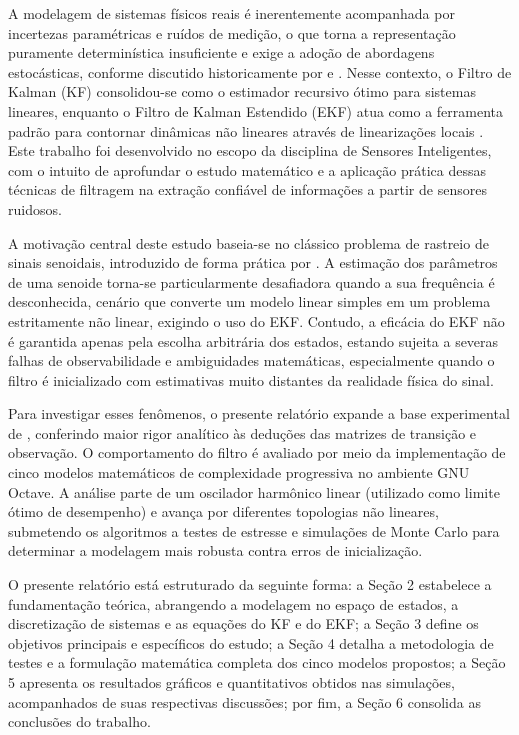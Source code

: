 \documentclass[a4paper,12pt]{article}
\begin{document}
A modelagem de sistemas físicos reais é inerentemente acompanhada por incertezas paramétricas e ruídos de medição, o que torna a representação puramente determinística insuficiente e exige a adoção de abordagens estocásticas, conforme discutido historicamente por  e . Nesse contexto, o Filtro de Kalman (KF) \cite{kalman1960} consolidou-se como o estimador recursivo ótimo para sistemas lineares, enquanto o Filtro de Kalman Estendido (EKF) atua como a ferramenta padrão para contornar dinâmicas não lineares através de linearizações locais \cite{gelb1974, simon2006}. Este trabalho foi desenvolvido no escopo da disciplina de Sensores Inteligentes, com o intuito de aprofundar o estudo matemático e a aplicação prática dessas técnicas de filtragem na extração confiável de informações a partir de sensores ruidosos.

A motivação central deste estudo baseia-se no clássico problema de rastreio de sinais senoidais, introduzido de forma prática por . A estimação dos parâmetros de uma senoide torna-se particularmente desafiadora quando a sua frequência é desconhecida, cenário que converte um modelo linear simples em um problema estritamente não linear, exigindo o uso do EKF. Contudo, a eficácia do EKF não é garantida apenas pela escolha arbitrária dos estados, estando sujeita a severas falhas de observabilidade e ambiguidades matemáticas, especialmente quando o filtro é inicializado com estimativas muito distantes da realidade física do sinal.

Para investigar esses fenômenos, o presente relatório expande a base experimental de , conferindo maior rigor analítico às deduções das matrizes de transição e observação. O comportamento do filtro é avaliado por meio da implementação de cinco modelos matemáticos de complexidade progressiva no ambiente GNU Octave. A análise parte de um oscilador harmônico linear (utilizado como limite ótimo de desempenho) e avança por diferentes topologias não lineares, submetendo os algoritmos a testes de estresse e simulações de Monte Carlo para determinar a modelagem mais robusta contra erros de inicialização.

O presente relatório está estruturado da seguinte forma: a Seção 2 estabelece a fundamentação teórica, abrangendo a modelagem no espaço de estados, a discretização de sistemas e as equações do KF e do EKF; a Seção 3 define os objetivos principais e específicos do estudo; a Seção 4 detalha a metodologia de testes e a formulação matemática completa dos cinco modelos propostos; a Seção 5 apresenta os resultados gráficos e quantitativos obtidos nas simulações, acompanhados de suas respectivas discussões; por fim, a Seção 6 consolida as conclusões do trabalho.
\end{document}
